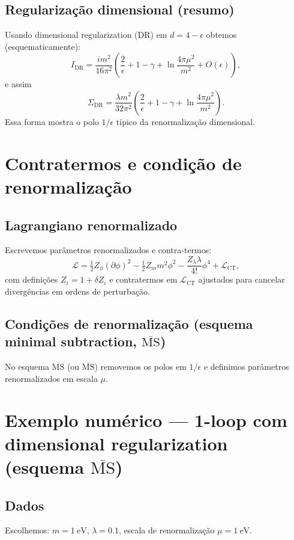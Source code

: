 \documentclass[12pt,a4paper]{article}
\begin{document}
\subsection{Regularização dimensional (resumo)}
Usando dimensional regularization (DR) em \(d=4-\epsilon\) obtemos (esquematicamente):
\begin{equation}
I_{\text{DR}} = \frac{i m^2}{16\pi^2} \left(\frac{2}{\epsilon} + 1 - \gamma + \ln\frac{4\pi\mu^2}{m^2} + O(\epsilon)\right),
\end{equation}
e assim
\begin{equation}
\Sigma_{\text{DR}} = \frac{\lambda m^2}{32\pi^2} \left(\frac{2}{\epsilon} + 1 - \gamma + \ln\frac{4\pi\mu^2}{m^2}\right).
\end{equation}
Essa forma mostra o polo \(1/\epsilon\) típico da renormalização dimensional.  %

\section{Contratermos e condição de renormalização}
\subsection{Lagrangiano renormalizado}
Escrevemos parâmetros renormalizados e contra-termos:
\begin{equation}
\mathcal{L} = \tfrac12 Z_\phi (\partial\phi)^2 - \tfrac12 Z_m m^2 \phi^2 - \frac{Z_\lambda \lambda}{4!} \phi^4 + \mathcal{L}_{\text{CT}},
\end{equation}
com definições \(Z_i = 1 + \delta Z_i\) e contratermos em \(\mathcal{L}_{\text{CT}}\) ajustados para cancelar divergências em ordens de perturbação.

\subsection{Condições de renormalização (esquema minimal subtraction, $\overline{\text{MS}}$)}
No esquema MS (ou \(\overline{\text{MS}}\)) removemos os polos em \(1/\epsilon\) e definimos parâmetros renormalizados em escala \(\mu\).

\section{Exemplo numérico — 1-loop com dimensional regularization (esquema $\overline{\text{MS}}$)}
\subsection{Dados}
Escolhemos: \(m=1\ \mathrm{eV}\), \(\lambda = 0.1\), escala de renormalização \(\mu = 1\ \mathrm{eV}\).
\end{document}

